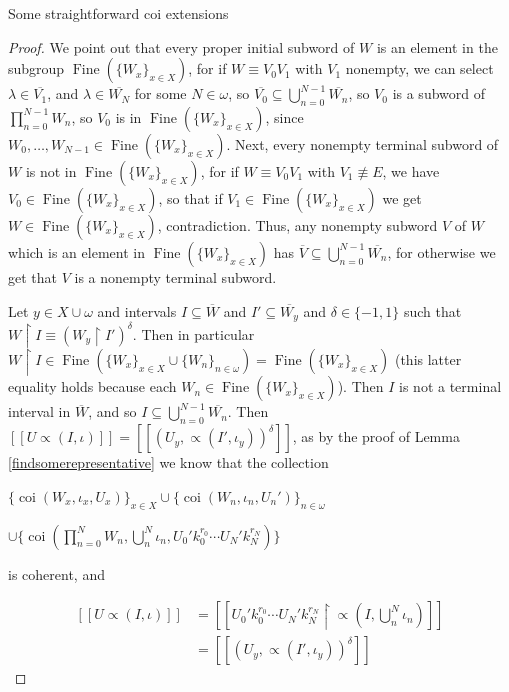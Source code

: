 \documentclass{amsart}
\theoremstyle{definition}\newtheorem{theorem}{Theorem}
\theoremstyle{definition}\newtheorem*{A}{Main Theorem}
\theoremstyle{definition}\newtheorem*{B}{Theorem \ref{elementaryequiv}}
\theoremstyle{definition}\newtheorem*{C}{Theorem \ref{continuous}}
\theoremstyle{definition}\newtheorem*{D}{Theorem \ref{bigisomorphism2}}
\theoremstyle{definition}\newtheorem{bigtheorem}{Main Theorem}
\numberwithin{theorem}{section}
\theoremstyle{definition}\newtheorem{corollary}[theorem]{Corollary}
\theoremstyle{definition}\newtheorem{proposition}[theorem]{Proposition}
\theoremstyle{definition}\newtheorem{definition}[theorem]{Definition}
\theoremstyle{definition}\newtheorem{question}[theorem]{Question}
\theoremstyle{definition}\newtheorem{example}[theorem]{Example}
\theoremstyle{definition}\newtheorem{remark}[theorem]{Remark}
\theoremstyle{definition}\newtheorem{note}[theorem]{Note}
\theoremstyle{definition}\newtheorem{lemma}[theorem]{Lemma}
\theoremstyle{definition}\newtheorem{fact}[theorem]{Fact}
\theoremstyle{definition}\newtheorem{define}[theorem]{Definition}
\theoremstyle{definition}\newtheorem{claim}[theorem]{Claim}
\theoremstyle{definition}\newtheorem{obs}[theorem]{Observation}
\theoremstyle{definition}\newtheorem{definitions}[theorem]{Definitions}
\newcommand{\Fine}{\operatorname{Fine}}
\newcommand{\coi}{\operatorname{coi}}
\begin{document}
\begin{section}{Some straightforward coi extensions}
\begin{proof}
We point out that every proper initial subword of $W$ is an element in the subgroup $\Fine(\{W_x\}_{x \in X})$, for if $W \equiv V_0V_1$ with $V_1$ nonempty, we can select $\lambda \in \overline{V_1}$, and $\lambda \in \overline{W_N}$ for some $N \in \omega$, so $\overline{V_0} \subseteq \bigcup_{n = 0}^{N-1}\overline{W_n}$, so $V_0$ is a subword of $\prod_{n = 0}^{N-1}W_n$, so $V_0$ is in $\Fine(\{W_x\}_{x \in X})$, since $W_0, \ldots, W_{N-1} \in \Fine(\{W_x\}_{x \in X})$.  Next, every nonempty terminal subword of $W$ is not in $\Fine(\{W_x\}_{x \in X})$, for if $W \equiv V_0V_1$ with $V_1 \not\equiv E$, we have $V_0 \in \Fine(\{W_x\}_{x \in X})$, so that if $V_1 \in \Fine(\{W_x\}_{x \in X})$ we get $W \in \Fine(\{W_x\}_{x \in X})$, contradiction.  Thus, any nonempty subword $V$ of $W$ which is an element in $\Fine(\{W_x\}_{x \in X})$ has $\overline{V} \subseteq \bigcup_{n = 0}^{N-1}\overline{W_n}$, for otherwise we get that $V$ is a nonempty terminal subword.

Let $y \in X \cup \omega$ and intervals $I \subseteq \overline{W}$ and $I' \subseteq \overline{W_y}$ and $\delta \in \{-1, 1\}$ such that $W\upharpoonright I \equiv (W_y \upharpoonright I')^{\delta}$.  Then in particular $W \upharpoonright I \in \Fine(\{W_x\}_{x \in X} \cup \{W_n\}_{n \in \omega}) = \Fine(\{W_x\}_{x \in X})$ (this latter equality holds because each $W_n \in \Fine(\{W_x\}_{x \in X})$).  Then $I$ is not a terminal interval in $\overline{W}$, and so $I \subseteq \bigcup_{n = 0}^{N-1}\overline{W_n}$.  Then $[[U \varpropto(I, \iota)]] = [[(U_y, \varpropto(I', \iota_y))^{\delta}]]$, as by the proof of Lemma \ref{findsomerepresentative} we know that the collection 

\begin{center}
$\{\coi(W_x, \iota_x, U_x)\}_{x \in X} \cup \{\coi(W_n, \iota_n, U_n')\}_{n \in \omega}$

 $\cup \{\coi(\prod_{n = 0}^NW_n, \bigcup_{n}^N \iota_n, U_0'k_0^{r_0}\cdots U_N'k_N^{r_N})\}$
\end{center}

\noindent is coherent, and 



$$
\begin{array}{ll}
[[U \varpropto(I, \iota)]] & = [[U_0'k_0^{r_0}\cdots U_N'k_N^{r_N} \upharpoonright \varpropto(I, \bigcup_{n}^N \iota_n)]]\\
& = [[(U_y, \varpropto(I', \iota_y))^{\delta}]]



\end{array}
$$


\end{proof}
\end{section}
\end{document}
